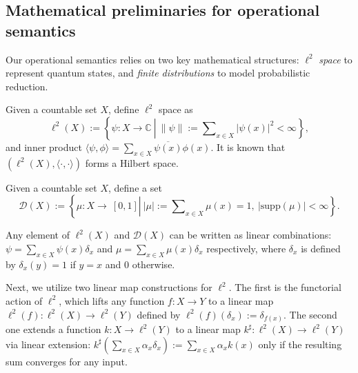 \subsection{Mathematical preliminaries for operational semantics} \label{sec:math-prelim}
Our operational semantics relies on two key mathematical structures: $\ell^2$ \textit{space} to represent quantum states, and \textit{finite distributions} to model probabilistic reduction.

\begin{dfn}
  Given a countable set $X$, define $\ell^2$ space as
  \begin{equation*}
    \ell^2(X) := \left\{\psi : X\to\mathbb{C}\ \left|\ \|\psi\| := \sum\nolimits_{x\in X} |\psi(x)|^2 < \infty \right.\right\},
  \end{equation*}
  and inner product $\langle \psi, \phi \rangle = \sum\nolimits_{x\in X} \overline{\psi(x)} \phi(x)$.
  It is known that $(\ell^2(X), \langle\cdot,\cdot\rangle)$ forms a Hilbert space.
\end{dfn}

\begin{dfn}
  Given a countable set $X$, define a set
  \begin{equation*}
    \mathcal{D}(X) := \left\{\mu : X \to \ [0,1] \left|\ |\mu| := \sum\nolimits_{x\in X} \mu(x) = 1,\ |\mathrm{supp}(\mu)| < \infty\right.\right\}.
  \end{equation*}
\end{dfn}
Any element of $\ell^2(X)$ and $\mathcal{D}(X)$ can be written as linear combinations: $\psi = \sum_{x\in X} \psi(x) \delta_x$ and $\mu = \sum_{x\in X} \mu(x)\delta_x$ respectively, where $\delta_x$ is defined by $\delta_x(y) = 1$ if $y = x$ and $0$ otherwise.

Next, we utilize two linear map constructions for $\ell^2$.
The first is the functorial action of $\ell^2$, which lifts any function $f: X \to Y$ to a linear map $\ell^2(f): \ell^2(X) \to \ell^2(Y)$ defined by $\ell^2(f)(\delta_x) := \delta_{f(x)}$.
The second one extends a function $k: X \to \ell^2(Y)$ to a linear map $k^\sharp: \ell^2(X) \to \ell^2(Y)$ via linear extension: $k^\sharp(\sum_{x \in X} \alpha_x \delta_x) := \sum_{x \in X} \alpha_x k(x)$ only if the resulting sum converges for any input.